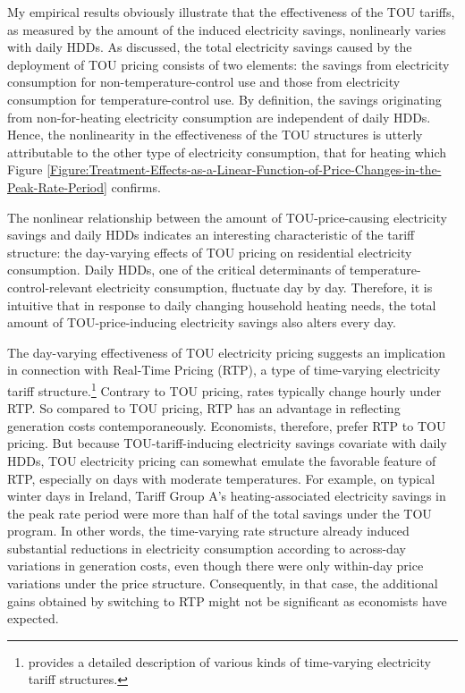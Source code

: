 My empirical results obviously illustrate that the effectiveness of the TOU tariffs, as measured by the amount of the induced electricity savings, nonlinearly varies with daily HDDs. As discussed, the total electricity savings caused by the deployment of TOU pricing consists of two elements: the savings from electricity consumption for non-temperature-control use and those from electricity consumption for temperature-control use. By definition, the savings originating from non-for-heating electricity consumption are independent of daily HDDs. Hence, the nonlinearity in the effectiveness of the TOU structures is utterly attributable to the other type of electricity consumption, that for heating which Figure \ref{Figure:Treatment-Effects-as-a-Linear-Function-of-Price-Changes-in-the-Peak-Rate-Period} confirms. 

The nonlinear relationship between the amount of TOU-price-causing electricity savings and daily HDDs indicates an interesting characteristic of the tariff structure: the day-varying effects of TOU pricing on residential electricity consumption. Daily HDDs, one of the critical determinants of temperature-control-relevant electricity consumption, fluctuate day by day. Therefore, it is intuitive that in response to daily changing household heating needs, the total amount of TOU-price-inducing electricity savings also alters every day. 

The day-varying effectiveness of TOU electricity pricing suggests an implication in connection with Real-Time Pricing (RTP), a type of time-varying electricity tariff structure.\footnote{\cite{Household-Responses-to-Time-Varying-Electricity-Prices_Harding-and-Sexton_2017} provides a detailed description of various kinds of time-varying electricity tariff structures.} Contrary to TOU pricing, rates typically change hourly under RTP. So compared to TOU pricing, RTP has an advantage in reflecting generation costs contemporaneously. Economists, therefore, prefer RTP to TOU pricing. But because TOU-tariff-inducing electricity savings covariate with daily HDDs, TOU electricity pricing can somewhat emulate the favorable feature of RTP, especially on days with moderate temperatures. For example, on typical winter days in Ireland, Tariff Group A's heating-associated electricity savings in the peak rate period were more than half of the total savings under the TOU program. In other words, the time-varying rate structure already induced substantial reductions in electricity consumption according to across-day variations in generation costs, even though there were only within-day price variations under the price structure. Consequently, in that case, the additional gains obtained by switching to RTP might not be significant as economists have expected. 

